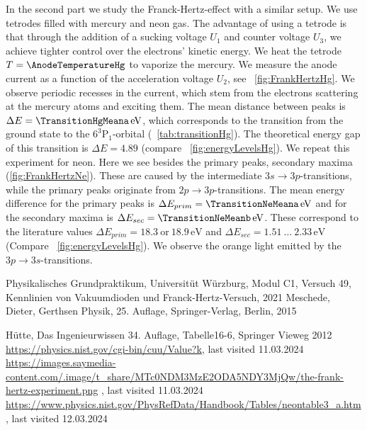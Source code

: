 \documentclass[a4paper,10pt,twocolumn]{article}
\newcommand{\eV}{\, \mathrm{eV}}
\newcommand{\HgLevelA}{6^3\mathrm{P}_1}
\newcommand{\TheoreticalTransitionHga}{4.89}
\newcommand{\TheoreticalTransitionNea}{18.9}
\newcommand{\TheoreticalTransitionNeaa}{18.3}
\newcommand{\TheoreticalTransitionNeb}{1.51 \ \dots \ 2.33}
\begin{document}
    In the second part we study the Franck-Hertz-effect with a similar setup.
    We use tetrodes filled with mercury and neon gas.
    The advantage of using a tetrode is that through the addition of a sucking voltage $U_1$ and counter voltage
    $U_3$, we achieve tighter control over the electrons' kinetic energy.
    We heat the tetrode $T = \AnodeTemperatureHg$ to vaporize the mercury.
    We measure the anode current as a function of the acceleration voltage $U_2$, see ~\autoref{fig:FrankHertzHg}.
    We observe periodic recesses in the current, which stem from the electrons scattering 
    at the mercury atoms and exciting them.
    The mean distance between peaks is $\Delta E = \TransitionHgMeana \eV$, which corresponds to the 
    transition from the ground state to the $\HgLevelA$-orbital (~\autoref{tab:transitionHg}).
    The theoretical energy gap of this transition is $\Delta E = \TheoreticalTransitionHga$
    (compare ~\autoref{fig:energyLevelsHg}).
    We repeat this experiment for neon.
    Here we see besides the primary peaks, secondary maxima (\autoref{fig:FrankHertzNe}).
    These are caused by the intermediate $3s \rightarrow 3p$-transitions, while the primary peaks originate
    from $2p \rightarrow 3p$-transitions.
    The mean energy difference for the primary peaks is $\Delta E_{prim} = \TransitionNeMeana \eV$ and for the
    secondary maxima is $\Delta E_{sec} = \TransitionNeMeanb \eV$.
    These correspond to the literature values 
    $\Delta E_{prim} = \TheoreticalTransitionNeaa \ \mathrm{or} \ \TheoreticalTransitionNea \eV$
    and $\Delta E_{sec} = \TheoreticalTransitionNeb \eV$ (Compare ~\autoref{fig:energyLevelsHg}).
    We observe the orange light emitted by the $3p \rightarrow 3s$-transitions.


    \begin{thebibliography}{}    %
         Physikalisches Grundpraktikum, Universitüt Würzburg, Modul C1, Versuch 49, Kennlinien von Vakuumdioden
        und Franck-Hertz-Versuch, 2021
         Meschede, Dieter, Gerthsen Physik, 25. Auflage, Springer-Verlag, Berlin, 2015

          Hütte, Das Ingenieurwissen 34. Auflage, Tabelle16-6, Springer Vieweg 2012
          \url{https://physics.nist.gov/cgi-bin/cuu/Value?k}, last visited 11.03.2024
         \url{https://images.saymedia-content.com/.image/t_share/MTc0NDM3MzE2ODA5NDY3MjQw/the-frank-hertz-experiment.png} , last visited 11.03.2024
         \url{https://www.physics.nist.gov/PhysRefData/Handbook/Tables/neontable3_a.htm} , last visited 12.03.2024
    \end{thebibliography}
    
\end{document}
